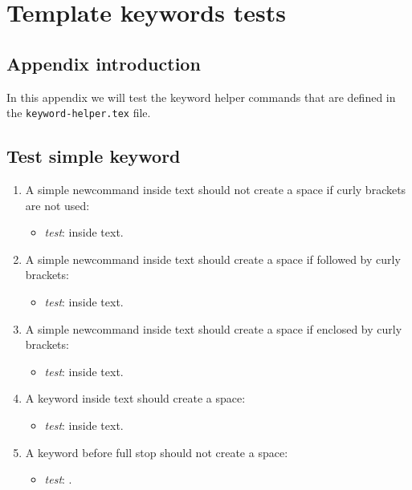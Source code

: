\chapter{Template keywords tests}
\label{appendix:keywords-tests}
\acresetall

\section{Appendix introduction}

In this appendix we will test the keyword helper commands that are defined in the \texttt{keyword-helper.tex} file.

\section{Test simple keyword}

\begin{enumerate}

\item A simple newcommand inside text should not create a space if curly brackets are not used:
\begin{itemize}
\item \textit{test}: \simpleNewcommand inside text.
\end{itemize}

\item A simple newcommand inside text should create a space if followed by curly brackets:
\begin{itemize}
\item \textit{test}: \simpleNewcommand{} inside text.
\end{itemize}

\item A simple newcommand inside text should create a space if enclosed by curly brackets:
\begin{itemize}
\item \textit{test}: {\simpleNewcommand} inside text.
\end{itemize}

\item A keyword inside text should create a space:
\begin{itemize}
\item \textit{test}: \keywordExample inside text.
\end{itemize}

\item A keyword before full stop should not create a space: 
\begin{itemize}
\item \textit{test}: \keywordExample.
\end{itemize}

\end{enumerate}


